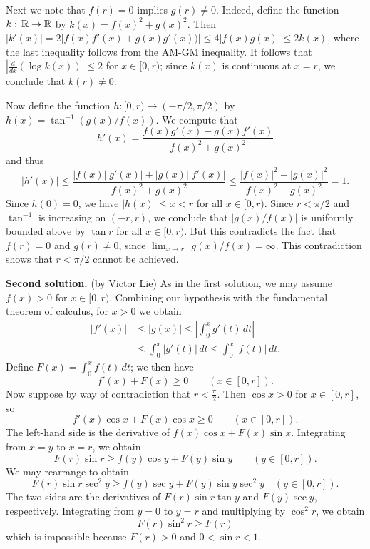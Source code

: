 \documentclass[amssymb,twocolumn,pra,10pt,aps]{revtex4-1}
\begin{document}
\begin{itemize}
Next we note that $f(r)=0$ implies $g(r) \neq 0$. Indeed, define the function $k :\thinspace \mathbb{R} \to \mathbb{R}$ by $k(x) = f(x)^2+g(x)^2$. Then $|k'(x)| = 2|f(x)f'(x)+g(x)g'(x))| \leq 4|f(x)g(x)| \leq 2k(x)$, where the last inequality follows from the AM-GM inequality. It follows that $\left|\frac{d}{dx} (\log k(x))\right| \leq 2$ for $x \in [0,r)$; since $k(x)$ is continuous at $x=r$, we conclude that $k(r) \neq 0$.

Now define the function $h\colon [0,r) \to (-\pi/2,\pi/2)$ by $h(x) = \tan^{-1}(g(x)/f(x))$. We compute that
\[
h'(x) = \frac{f(x)g'(x)-g(x)f'(x)}{f(x)^2+g(x)^2}
\]
and thus
\[
|h'(x)| \leq \frac{|f(x)||g'(x)|+|g(x)||f'(x)|}{f(x)^2+g(x)^2} \leq \frac{|f(x)|^2+|g(x)|^2}{f(x)^2+g(x)^2} = 1.
\]
Since $h(0) = 0$, we have $|h(x)| \leq x<r$ for all $x\in [0,r)$. Since $r<\pi/2$ and $\tan^{-1}$ is increasing on $(-r,r)$, we conclude that $|g(x)/f(x)|$ is uniformly bounded above by $\tan r$ for all $x\in [0,r)$. But this contradicts the fact that $f(r)=0$ and $g(r) \neq 0$, since $\lim_{x\to r^-} g(x)/f(x) = \infty$. This contradiction shows that $r<\pi/2$ cannot be achieved.

\noindent
\textbf{Second solution.}
(by Victor Lie)
As in the first solution, we may assume $f(x) > 0$ 
for $x \in [0,r)$.
Combining our hypothesis with the fundamental theorem of calculus, for $x > 0$ we obtain
\begin{align*}
|f'(x)| &\leq |g(x)| \leq \left| \int_0^x g'(t)\,dt \right|  \\
& \leq \int_0^x |g'(t)| \,dt \leq \int_0^x |f(t)|\,dt.
\end{align*}
Define $F(x) = \int_0^x f(t)\,dt$; we then have
\[
f'(x) + F(x) \geq 0 \qquad (x \in [0,r]).
\]
Now suppose by way of contradiction that $r < \frac{\pi}{2}$.
Then $\cos x > 0$ for $x \in [0,r]$, so 
\[
f'(x) \cos x + F(x) \cos x \geq 0 \qquad (x \in [0,r]).
\]
The left-hand side is the derivative of $f(x) \cos x + F(x) \sin x $. Integrating from $x=y$ to $x=r$, we obtain
\[
F(r) \sin r \geq f(y) \cos y + F(y) \sin y \qquad (y \in [0,r]).
\]
We may rearrange to obtain
\[
F(r)\sin r \sec^2 y \geq f(y) \sec y + F(y) \sin y \sec^2 y \quad (y \in [0,r]).
\]
The two sides are the derivatives of $F(r) \sin r \tan y$ and $F(y) \sec y$, respectively.
Integrating from $y=0$ to $y=r$ and multiplying by $\cos^2 r$, we obtain
\[
F(r) \sin^2 r \geq F(r)
\]
which is impossible because $F(r) > 0$ and $0 < \sin r < 1$.


\end{itemize}
\end{document}

